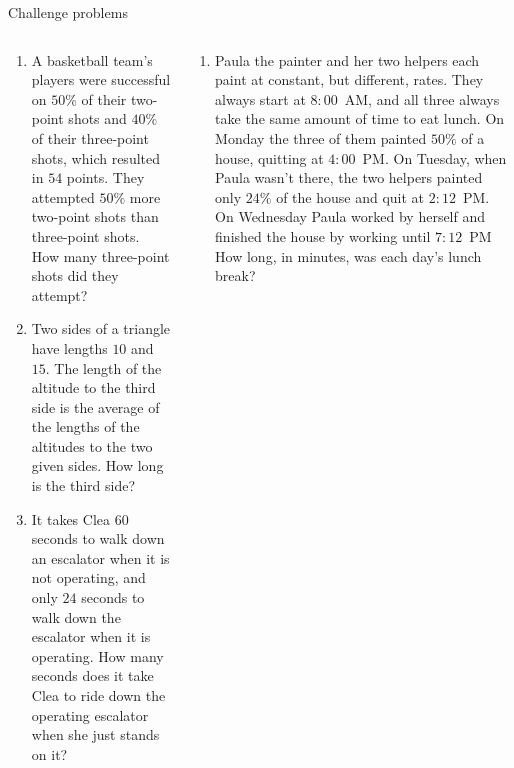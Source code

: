 \documentclass[9pt,aspectratio=169]{beamer}
\begin{document}
\begin{frame}{Challenge problems}
  \begin{columns}[T]
    \begin{column}{0.5\textwidth}
      \begin{enumerate}
        \item A basketball team's players were successful on $50\%$ of their two-point shots and $40\%$ of their three-point shots, which resulted in $54$ points. They attempted $50\%$ more two-point shots than three-point shots. How many three-point shots did they attempt?
        \item Two sides of a triangle have lengths $10$ and $15$. The length of the altitude to the third side is the average of the lengths of the altitudes to the two given sides. How long is the third side?
        \item It takes Clea $60$ seconds to walk down an escalator when it is not operating, and only $24$ seconds to walk down the escalator when it is operating. How many seconds does it take Clea to ride down the operating escalator when she just stands on it?
        \seti
      \end{enumerate}
    \end{column}
    \begin{column}{0.5\textwidth}
      \begin{enumerate}
        \conti
        \item Paula the painter and her two helpers each paint at constant, but different, rates. They always start at $8{:}00$~AM, and all three always take the same amount of time to eat lunch. On Monday the three of them painted $50\%$ of a house, quitting at $4{:}00$~PM. On Tuesday, when Paula wasn't there, the two helpers painted only $24\%$ of the house and quit at $2{:}12$~PM. On Wednesday Paula worked by herself and finished the house by working until $7{:}12$~PM How long, in minutes, was each day's lunch break?
      \end{enumerate}
    \end{column}
  \end{columns}
\end{frame}

\end{document}
